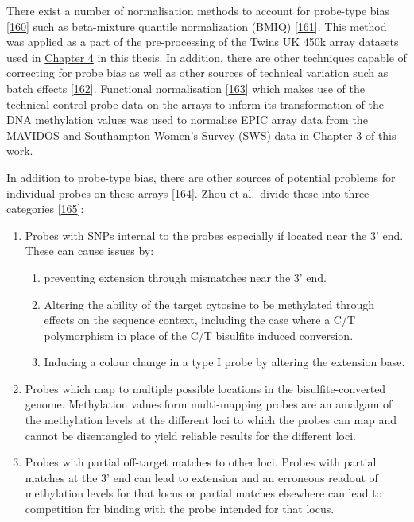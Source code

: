 \documentclass[
]{book}
\providecommand{\tightlist}{%
  \setlength{\itemsep}{0pt}\setlength{\parskip}{0pt}}
\begin{document}
There exist a number of normalisation methods to account for probe-type bias {[}\protect\hyperlink{ref-Fortin2016}{160}{]} such as beta-mixture quantile normalization (BMIQ) {[}\protect\hyperlink{ref-Teschendorff2013}{161}{]}.
This method was applied as a part of the pre-processing of the Twins UK 450k array datasets used in \protect\hyperlink{tRNAs}{Chapter 4} in this thesis.
In addition, there are other techniques capable of correcting for probe bias as well as other sources of technical variation such as batch effects {[}\protect\hyperlink{ref-Leek2010}{162}{]}.
Functional normalisation {[}\protect\hyperlink{ref-Fortin2014}{163}{]} which makes use of the technical control probe data on the arrays to inform its transformation of the DNA methylation values was used to normalise EPIC array data from the MAVIDOS and Southampton Women's Survey (SWS) data in \protect\hyperlink{arrays}{Chapter 3} of this work.

In addition to probe-type bias, there are other sources of potential problems for individual probes on these arrays {[}\protect\hyperlink{ref-Pidsley2016}{164}{]}.
Zhou et al.~divide these into three categories {[}\protect\hyperlink{ref-Zhou2017}{165}{]}:

\begin{enumerate}
\def\labelenumi{\arabic{enumi}.}
\tightlist
\item
  Probes with SNPs internal to the probes especially if located near the 3' end.
  These can cause issues by:

  \begin{enumerate}
  \def\labelenumii{\alph{enumii})}
  \tightlist
  \item
    preventing extension through mismatches near the 3' end.
  \item
    Altering the ability of the target cytosine to be methylated through effects on the sequence context, including the case where a C/T polymorphism in place of the C/T bisulfite induced conversion.
  \item
    Inducing a colour change in a type I probe by altering the extension base.
  \end{enumerate}
\item
  Probes which map to multiple possible locations in the bisulfite-converted genome.
  Methylation values form multi-mapping probes are an amalgam of the methylation levels at the different loci to which the probes can map and cannot be disentangled to yield reliable results for the different loci.
\item
  Probes with partial off-target matches to other loci.
  Probes with partial matches at the 3' end can lead to extension and an erroneous readout of methylation levels for that locus or partial matches elsewhere can lead to competition for binding with the probe intended for that locus.
\end{enumerate}
\end{document}
